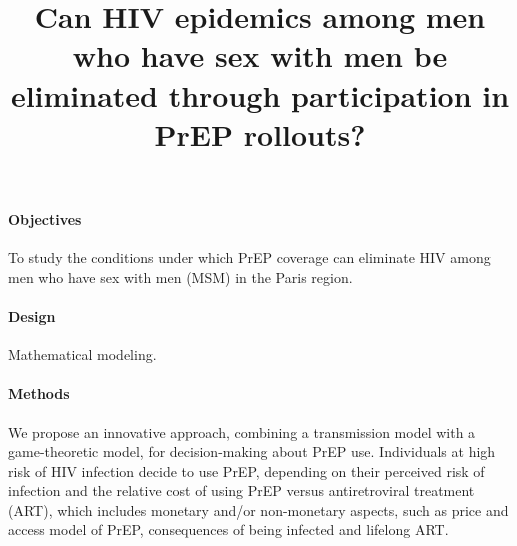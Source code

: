 \documentclass[preprint,review,12pt]{article}			%
\begin{document}

\title{Can HIV epidemics among men who have sex with men be eliminated through participation in PrEP rollouts?}
 
%
%
%
%
%

\maketitle 



\paragraph{Objectives}
To study the conditions under which PrEP coverage can eliminate HIV among men who have sex with men (MSM) in the Paris region.  

\paragraph{Design} 
Mathematical modeling.

\paragraph{Methods}
We propose an innovative approach, combining a transmission model with a game-theoretic model, for decision-making about PrEP use. Individuals at high risk of HIV infection decide to use PrEP, depending on their perceived risk of infection and the relative cost of using PrEP versus antiretroviral treatment (ART), which includes monetary and/or non-monetary aspects, such as price and access model of PrEP, consequences of being infected and lifelong ART. 
\end{document}
